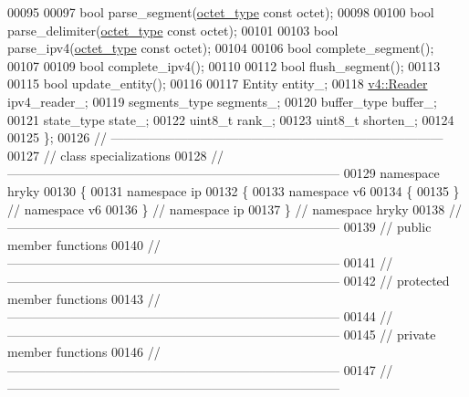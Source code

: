 \begin{DoxyCode}
00095 
00097     \textcolor{keywordtype}{bool} parse\_segment(\hyperlink{namespacehryky_a488cba8b666be33ccca70e819684e3c8}{octet_type} \textcolor{keyword}{const} octet);
00098 
00100     \textcolor{keywordtype}{bool} parse\_delimiter(\hyperlink{namespacehryky_a488cba8b666be33ccca70e819684e3c8}{octet_type} \textcolor{keyword}{const} octet);
00101 
00103     \textcolor{keywordtype}{bool} parse\_ipv4(\hyperlink{namespacehryky_a488cba8b666be33ccca70e819684e3c8}{octet_type} \textcolor{keyword}{const} octet);
00104 
00106     \textcolor{keywordtype}{bool} complete\_segment();
00107 
00109     \textcolor{keywordtype}{bool} complete\_ipv4();
00110 
00112     \textcolor{keywordtype}{bool} flush\_segment();
00113 
00115     \textcolor{keywordtype}{bool} update\_entity();
00116 
00117     Entity          entity\_;
00118     \hyperlink{classhryky_1_1ip_1_1v4_1_1_reader}{v4::Reader}      ipv4\_reader\_;
00119     segments\_type   segments\_;
00120     buffer\_type     buffer\_;
00121     state\_type      state\_;
00122     uint8\_t         rank\_;
00123     uint8\_t         shorten\_;
00124 
00125 \};
00126 \textcolor{comment}{//
      ------------------------------------------------------------------------------}
00127 \textcolor{comment}{// class specializations}
00128 \textcolor{comment}{//
      ------------------------------------------------------------------------------}
00129 \textcolor{keyword}{namespace }hryky
00130 \{
00131 \textcolor{keyword}{namespace }ip
00132 \{
00133 \textcolor{keyword}{namespace }v6
00134 \{
00135 \} \textcolor{comment}{// namespace v6}
00136 \} \textcolor{comment}{// namespace ip}
00137 \} \textcolor{comment}{// namespace hryky}
00138 \textcolor{comment}{//
      ------------------------------------------------------------------------------}
00139 \textcolor{comment}{// public member functions}
00140 \textcolor{comment}{//
      ------------------------------------------------------------------------------}
00141 \textcolor{comment}{//
      ------------------------------------------------------------------------------}
00142 \textcolor{comment}{// protected member functions}
00143 \textcolor{comment}{//
      ------------------------------------------------------------------------------}
00144 \textcolor{comment}{//
      ------------------------------------------------------------------------------}
00145 \textcolor{comment}{// private member functions}
00146 \textcolor{comment}{//
      ------------------------------------------------------------------------------}
00147 \textcolor{comment}{//
      ------------------------------------------------------------------------------}

\end{DoxyCode}
